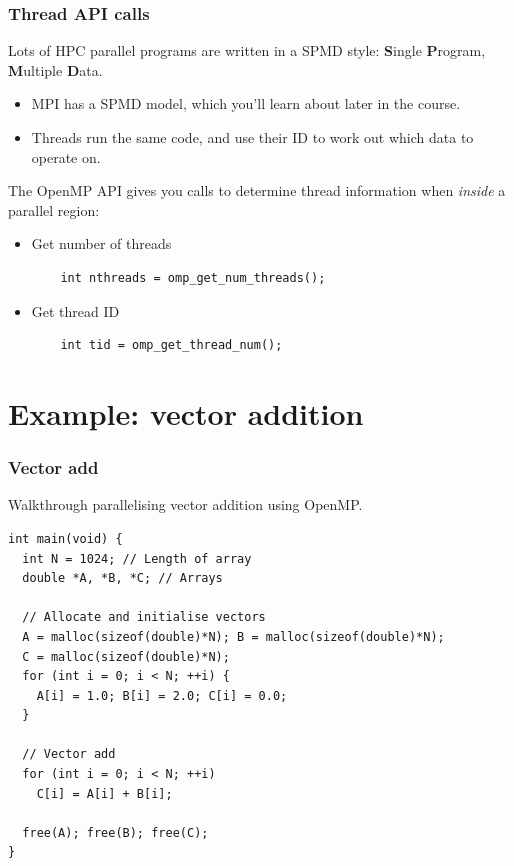 \documentclass[aspectratio=169]{beamer}
\begin{document}
\begin{frame}[fragile]
\frametitle{Thread API calls}
Lots of HPC parallel programs are written in a SPMD style: \newline
{\bf S}ingle {\bf P}rogram, {\bf M}ultiple {\bf D}ata.
\begin{itemize}
  \item MPI has a SPMD model, which you'll learn about later in the course.
  \item Threads run the same code, and use their ID to work out which data to operate on.
\end{itemize}

The OpenMP API gives you calls to determine thread information when \emph{inside} a parallel region:
\begin{itemize}
  \item Get number of threads
    \begin{verbatim}
    int nthreads = omp_get_num_threads();
    \end{verbatim}

  \item Get thread ID
    \begin{verbatim}
    int tid = omp_get_thread_num();
    \end{verbatim}

\end{itemize}
\end{frame}

\section{Example: vector addition}
\begin{frame}[fragile]
\frametitle{Vector add}
Walkthrough parallelising vector addition using OpenMP.

\begin{verbatim}
int main(void) {
  int N = 1024; // Length of array
  double *A, *B, *C; // Arrays

  // Allocate and initialise vectors
  A = malloc(sizeof(double)*N); B = malloc(sizeof(double)*N);
  C = malloc(sizeof(double)*N);
  for (int i = 0; i < N; ++i) {
    A[i] = 1.0; B[i] = 2.0; C[i] = 0.0;
  }

  // Vector add
  for (int i = 0; i < N; ++i)
    C[i] = A[i] + B[i];

  free(A); free(B); free(C);
}
\end{verbatim}
\end{frame}
\end{document}
